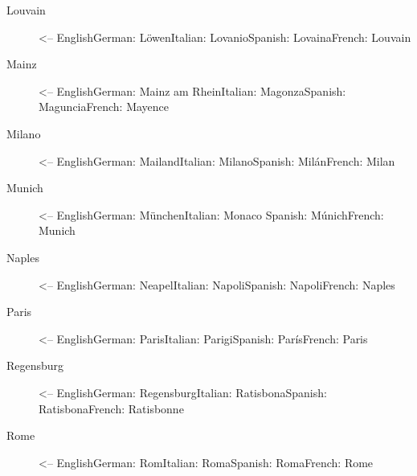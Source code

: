 \documentclass[a4paper,
10pt,
greek,
french,
spanish,
italian,
ngerman,
english,
]{ltxdoc}
\begin{document}
\begin{multicols}{3}
\begin{description}
\item[Louvain] <-- English\newline German: Löwen\newline Italian: Lovanio\newline Spanish: Lovaina\newline French: Louvain
\item[Mainz] <-- English\newline German: Mainz am Rhein\newline Italian: Magonza\newline Spanish: Maguncia\newline French: Mayence
\item[Milano] <-- English\newline German: Mailand\newline Italian: Milano\newline Spanish: Milán\newline French: Milan
\item[Munich] <-- English\newline German: München\newline Italian: Monaco \newline Spanish: Múnich\newline French: Munich
\item[Naples] <-- English\newline German: Neapel\newline Italian: Napoli\newline Spanish: Napoli\newline French: Naples
\item[Paris] <-- English\newline German: Paris\newline Italian: Parigi\newline Spanish: París\newline French: Paris
\item[Regensburg] <-- English\newline German: Regensburg\newline Italian: Ratisbona\newline Spanish: Ratisbona\newline French: Ratisbonne
\item[Rome] <-- English\newline German: Rom\newline Italian: Roma\newline Spanish: Roma\newline French: Rome

\end{description}
\end{multicols}
\end{document}
